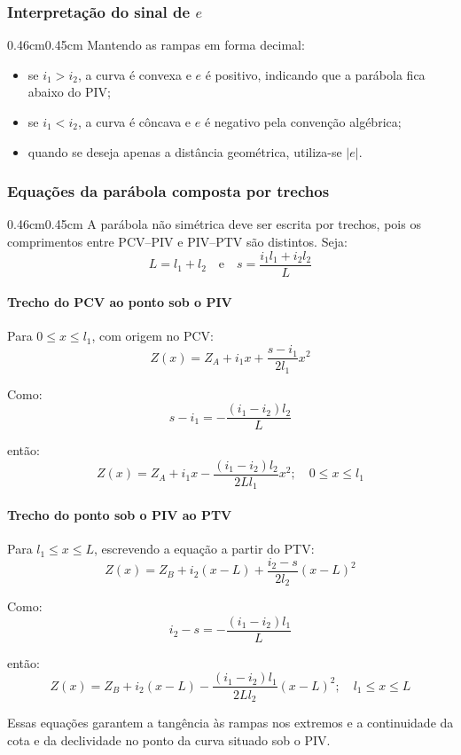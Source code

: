 \documentclass[12pt,letterpaper]{article}
\newenvironment{corpo}{\begin{adjustwidth}{0.46cm}{0.45cm}\justifying}{\end{adjustwidth}}
\begin{document}
\subsubsection*{Interpretação do sinal de $e$}

\begin{corpo}
Mantendo as rampas em forma decimal:
\begin{itemize}
    \item se $i_1>i_2$, a curva é convexa e $e$ é positivo, indicando que a parábola fica abaixo do PIV;
    \item se $i_1<i_2$, a curva é côncava e $e$ é negativo pela convenção algébrica;
    \item quando se deseja apenas a distância geométrica, utiliza-se $|e|$.
\end{itemize}
\end{corpo}

\subsubsection*{Equações da parábola composta por trechos}

\begin{corpo}
A parábola não simétrica deve ser escrita por trechos, pois os comprimentos entre PCV--PIV e PIV--PTV são distintos. Seja:
\[
 L=l_1+l_2 \quad \text{e} \quad s=\frac{i_1l_1+i_2l_2}{L}
\]

\paragraph*{Trecho do PCV ao ponto sob o PIV}

Para $0\leq x\leq l_1$, com origem no PCV:
\[
 Z(x)=Z_A+i_1x+\frac{s-i_1}{2l_1}x^2
\]

Como:
\[
 s-i_1=-\frac{(i_1-i_2)l_2}{L}
\]

então:
\[
 Z(x)=Z_A+i_1x-\frac{(i_1-i_2)l_2}{2Ll_1}x^2;\quad 0\leq x\leq l_1
\]

\paragraph*{Trecho do ponto sob o PIV ao PTV}

Para $l_1\leq x\leq L$, escrevendo a equação a partir do PTV:
\[
 Z(x)=Z_B+i_2(x-L)+\frac{i_2-s}{2l_2}(x-L)^2
\]

Como:
\[
 i_2-s=-\frac{(i_1-i_2)l_1}{L}
\]

então:
\[
 Z(x)=Z_B+i_2(x-L)-\frac{(i_1-i_2)l_1}{2Ll_2}(x-L)^2;\quad l_1\leq x\leq L
\]

Essas equações garantem a tangência às rampas nos extremos e a continuidade da cota e da declividade no ponto da curva situado sob o PIV.
\end{corpo}
\end{document}
